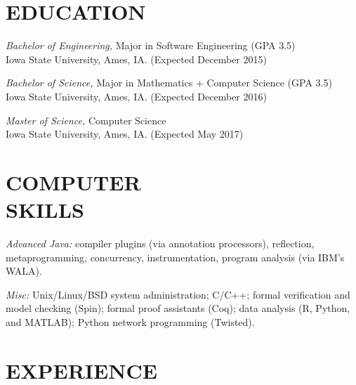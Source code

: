 \documentclass[margin, 10pt]{res} %
\begin{document}
\begin{resume}


\section{EDUCATION}

{\sl Bachelor of Engineering,} Major in Software Engineering (GPA 3.5) \\
Iowa State University, Ames, IA. (Expected December 2015)

{\sl Bachelor of Science,} Major in Mathematics + Computer Science (GPA 3.5) \\
Iowa State University, Ames, IA. (Expected December 2016)

{\sl Master of Science,} Computer Science \\
Iowa State University, Ames, IA. (Expected May 2017)



\section{COMPUTER \\ SKILLS}

{\sl Advanced Java:} compiler plugins (via annotation processors), reflection,
  metaprogramming, concurrency, instrumentation, program analysis (via IBM's
  WALA).

{\sl Misc:} Unix/Linux/BSD system administration; C/C++; formal verification and
  model checking (Spin); formal proof assistants (Coq); data analysis (R,
  Python, and MATLAB); Python network programming (Twisted).


\section{EXPERIENCE}


\end{resume}
\end{document}
